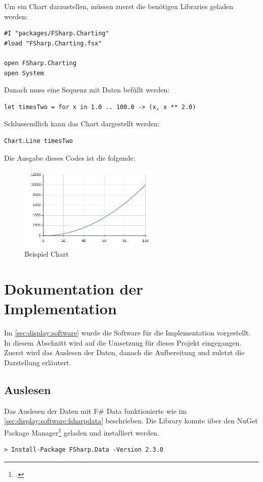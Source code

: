 Um ein Chart darzustellen, müssen zuerst die benötigen Libraries geladen werden:
\begin{lstlisting}
#I "packages/FSharp.Charting"
#load "FSharp.Charting.fsx"

open FSharp.Charting
open System
\end{lstlisting}

Danach muss eine Sequenz mit Daten befüllt werden:
\begin{lstlisting}
let timesTwo = for x in 1.0 .. 100.0 -> (x, x ** 2.0)
\end{lstlisting}

Schlussendlich kann das Chart dargestellt werden:
\begin{lstlisting}
Chart.Line timesTwo
\end{lstlisting}

Die Ausgabe dieses Codes ist die folgende:
\begin{figure}[H]
  \centering
  \includegraphics[width=0.6\textwidth]{./images/charting-timestwo.png}
  \caption{Beispiel Chart}
\end{figure}


\section{Dokumentation der Implementation}
Im \cref{sec:display:software}  wurde die Software für die Implementation vorgestellt. In diesem Abschnitt wird auf die Umsetzung für dieses Projekt eingegangen. Zuerst wird das Auslesen der Daten, danach die Aufbereitung und zuletzt die Darstellung erläutert.

\subsection{Auslesen}
\label{sec:display:documentation:reading}
Das Auslesen der Daten mit F\# Data funktionierte wie im \cref{sec:display:software:fsharpdata}  beschrieben. Die Library konnte über den NuGet Package Manager\footcite{NuGet_2016-06-18} geladen und installiert werden.
\begin{lstlisting}
> Install-Package FSharp.Data -Version 2.3.0
\end{lstlisting}

